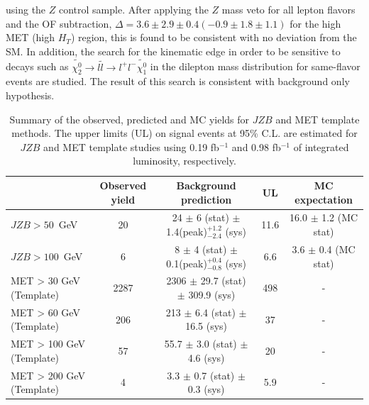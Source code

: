 \documentclass{PoS}
\begin{document}
using the $Z$ control sample. After applying the $Z$ mass veto for all lepton flavors and the OF subtraction, $\Delta = 3.6 \pm 2.9 \pm 0.4 (-0.9 \pm 1.8 \pm 1.1) $ 
for the high MET (high $H_T$) region, this is found to be consistent with no deviation from the SM. 
In addition, the search for the kinematic edge in order to be sensitive to decays such as $\tilde{\chi^{0}_{2}} \rightarrow l \tilde{l} \rightarrow l^+ l^- \tilde{\chi^{0}_{1}}$ 
in the dilepton mass distribution for same-flavor events are studied. The result of this search is consistent with background only hypothesis. 
\begin{table}[hbt]
\begin{center}
\caption{\label{tab:osz} 
Summary of the observed, predicted and MC yields for $JZB$ and MET template methods. The upper limits (UL) on signal events at 95\% C.L. are estimated for 
$JZB$ and  MET template studies using 0.19 fb$^{-1}$ and 0.98 fb$^{-1}$ of integrated luminosity, respectively.}
{\footnotesize
\begin{tabular}{l|c|c|c|c}
\hline
                                       &  Observed yield   &  Background prediction      & UL &   MC expectation      \\ 
\hline
$JZB > 50$~GeV                         &      20    &  24 $\pm$ 6 (stat) $\pm$ 1.4(peak)$^{+1.2}_{-2.4}$ (sys) & 11.6 & 16.0 $\pm$ 1.2 (MC stat) \\
$JZB > 100$~GeV                        &       6    &  8 $\pm$ 4 (stat) $\pm$ 0.1(peak)$^{+0.4}_{-0.8}$ (sys)  & 6.6 & 3.6 $\pm$ 0.4  (MC stat)    \\
\hline
MET > 30 GeV (Template)                &      2287  &  2306 $\pm$ 29.7 (stat) $\pm$ 309.9 (sys) & 498  & -         \\
MET > 60 GeV (Template)                &      206   &  213 $\pm$ 6.4 (stat) $\pm$ 16.5 (sys)   & 37 & -         \\
MET > 100 GeV (Template)               &      57    &  55.7 $\pm$ 3.0 (stat) $\pm$ 4.6 (sys)   & 20 & -         \\
MET > 200 GeV (Template)               &      4     &  3.3 $\pm$  0.7 (stat) $\pm$ 0.3 (sys)   & 5.9 & -         \\
\hline
\end{tabular} }
\end{center}
\end{table}
\end{document}
